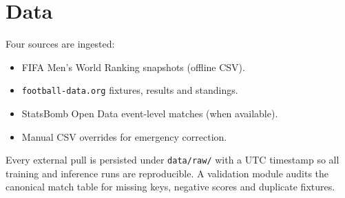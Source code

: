 \section{Data}
Four sources are ingested:
\begin{itemize}
  \item FIFA Men's World Ranking snapshots (offline CSV).
  \item \texttt{football-data.org} fixtures, results and standings.
  \item StatsBomb Open Data event-level matches (when available).
  \item Manual CSV overrides for emergency correction.
\end{itemize}
Every external pull is persisted under \texttt{data/raw/} with a UTC
timestamp so all training and inference runs are reproducible. A validation
module audits the canonical match table for missing keys, negative scores and
duplicate fixtures.
